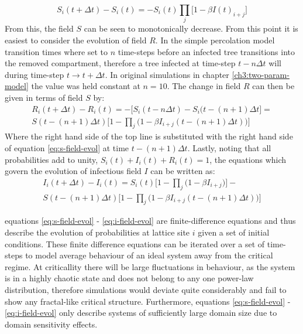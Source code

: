 \begin{equation}
    S_i(t+\Delta t) - S_i(t) =  - S_i(t)\prod_j \Big [1 - \beta I(t)_{i+j} \Big ] 
    \label{eq:s-field-evol}
\end{equation}
From this, the field $S$ can be seen to monotonically decrease. From this point it is easiest to consider the evolution of field $R$. In the simple percolation model transition times where set to $n$ time-steps before an infected tree transitions into the removed compartment, therefore a tree infected at time-step $t-n\Delta t$ will during time-step $t \rightarrow t + \Delta t$. In original simulations in chapter \ref{ch3:two-param-model} the value was held constant at $n = 10$. The change in field $R$ can then be given in terms of field $S$ by:
\begin{multline}
     R_i(t+\Delta t) - R_i(t)  = -\Big[S_i(t - n\Delta t) - S_i(t-(n+1)\Delta t\Big] = \\
     S(t - (n+1)\Delta t) \Big[ 1 - \prod_j \big(1 - \beta I_{i+j}(t - (n+1)\Delta t)\big)\Big]
     \label{eq:r-field-evol}
\end{multline}
Where the right hand side of the top line is substituted with the right hand side of equation \ref{eq:s-field-evol} at time $t-(n+1)\Delta t$. Lastly, noting that all probabilities add to unity, $S_i(t) + I_i(t) + R_i(t) = 1$, the equations which govern the evolution of infectious field $I$ can be written as:
\begin{multline}
    I_i(t+\Delta t) - I_i(t) = S_i(t)\Big[1 - \prod_j\big( 1 - \beta I_{i+j}\big)\Big] - \\ S(t - (n+1)\Delta t) \Big[ 1 - \prod_j \big(1 - \beta I_{i+j}(t - (n+1)\Delta t)\big)\Big]
    \label{eq:i-field-evol}
\end{multline}

equations \ref{eq:s-field-evol} - \ref{eq:i-field-evol} are finite-difference equations and thus describe the evolution of probabilities at lattice site $i$ given a set of initial conditions. These finite difference equations can be iterated over a set of time-steps to model average behaviour of an ideal system away from the critical regime. At criticallity there will be large fluctuations in behaviour, as the system is in a highly chaotic state and does not belong to any one power-law distribution, therefore simulations would deviate quite considerably and fail to show any fractal-like critical structure. Furthermore, equations \ref{eq:s-field-evol} - \ref{eq:i-field-evol} only describe systems of sufficiently large domain size due to domain sensitivity effects.

